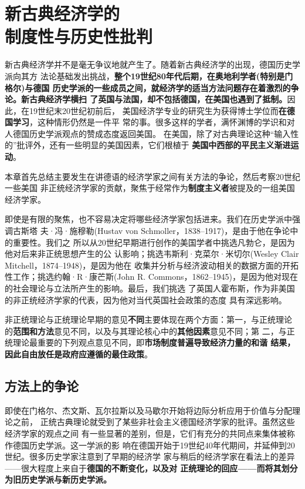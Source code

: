 \chapter{新古典经济学的\\制度性与历史性批判}

新古典经济学并不是毫无争议地就产生了。随着新古典经济学的出现，德国历史学派向其方
法论基础发出挑战，\textbf{整个19世纪80年代后期，在奥地利学者(特别是门格尔)与德国
历史学派的一些成员之间，就经济学的适当方法问题存在着激烈的争论。新古典经济学横扫
了英国与法国，却不包括德国，在美国也遇到了抵制。}因此，在19世纪末20世纪初前后，
美国经济学专业的研究生为获得博士学位而\textbf{在德国学习}，这种情形仍然是一件平
常的事。很多这样的学者，满怀渊博的学识和对人德国历史学派观点的赞成态度返回美国。
在美国，除了对古典理论这种“输入性的”批评外，还有一些明显的美国因素，它们根植于
\textbf{美国中西部的平民主义渐进运动}。

本章首先总结主要发生在讲德语的经济学家之间有关方法的争论，然后考察20世纪一些美国
非正统经济学家的贡献，聚焦于经常作为\textbf{制度主义者}被提及的一组美国经济学家。

即使是有限的聚焦，也不容易决定将哪些经济学家包括进来。我们在历史学派中强调古斯塔
夫·冯·施穆勒(Hustav von Schmoller，1838--1917)，是由于他在争论中的重要性。我们之
所以从20世纪早期进行创作的美国学者中挑选凡勃仑，是因为他对后来非正统思想产生的公
认影响；挑选韦斯利·克菜尔·米切尔(Wesley Clair Mitchell，1874--1948)，是因为他在
收集并分析与经济波动相关的数据方面的开拓性工作；挑选约翰·R·康芒斯(John R.
Commons，1862--1945)，是因为他对现在的社会理论与立法所产生的影响。最后，我们挑选
了英国人霍布斯，作为非美国的非正统经济学家的代表，因为他对当代英国社会政策的态度
具有深远影响。

非正统理论与正统理论早期的意见\textbf{不同}主要体现在两个方面：第一，与正统理论
的\textbf{范围和方法}意见不同，以及与其理论核心中的\textbf{其他因素}意见不同；第
二，与正统理论最重要的下列观点意见不同，即\textbf{市场制度普遍导致经济力量的和谐
结果，因此自由放任是政府应遵循的最住政策}。

\section{方法上的争论}

即使在门格尔、杰文斯、瓦尔拉斯以及马歇尔开始将边际分析应用于价值与分配理论之前，
正统古典理论就受到了某些非社会主义德国经济学家的批评。虽然这些经济学家的观点之间
有一些显著的差别，但是，它们有充分的共同点来集体被称作德国历史学派。这一学派的影
响在德国开始于19世纪40年代期间，并延伸到20世纪。很多历史学家注意到了早期的经济学
家与稍后的经济学家在看法上的差异——很大程度上来自于\textbf{德国的不断变化，以及对
正统理论的回应——而将其划分为旧历史学派与新历史学派。}

